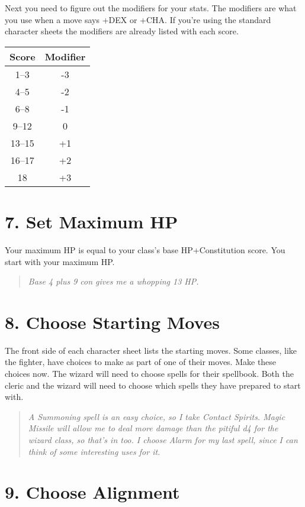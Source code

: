 Next you need to figure out the modifiers for your stats. The modifiers are what you use when a move says +DEX or +CHA\@. If you're using the standard character sheets the modifiers are already listed with each score.
\begin{center}
\begin{tabular}{|c|c|}\hline
Score & Modifier \\ \hline
1--3 & -3\\ \hline
4--5 & -2\\ \hline
6--8 & -1\\ \hline
9--12 & 0\\ \hline
13--15 & +1\\ \hline
16--17 & +2\\ \hline
18 & +3\\ \hline
\end{tabular}
\end{center}
\section{7. Set Maximum HP}

Your maximum HP is equal to your class's base HP+Constitution score. You start with your maximum HP\@.

\begin{quote}
\emph{Base 4 plus 9 con gives me a whopping 13 HP\@. }
\end{quote}
\section{8. Choose Starting Moves} 

The front side of each character sheet lists the starting moves. Some classes, like the fighter, have choices to make as part of one of their moves. Make these choices now. The wizard will need to choose spells for their spellbook. Both the cleric and the wizard will need to choose which spells they have prepared to start with.

\begin{quote}
\emph{A Summoning spell is an easy choice, so I take Contact Spirits. Magic Missile will allow me to deal more damage than the pitiful d4 for the wizard class, so that's in too. I choose Alarm for my last spell, since I can think of some interesting uses for it.}
\end{quote}
\section{9. Choose Alignment}

